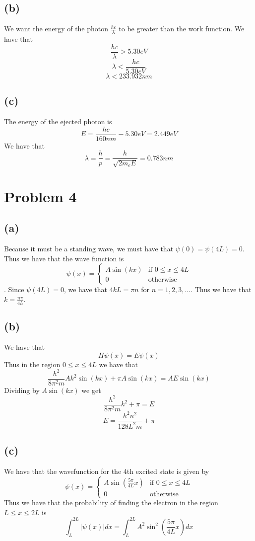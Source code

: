\subsection*{(b)}
We want the energy of the photon $\frac{hc}{\lambda}$ to be 
greater than the work function. We have that
$$\frac{hc}{\lambda}>5.30eV$$
$$\lambda<\frac{hc}{5.30eV}$$
$$\lambda<\boxed{233.932nm}$$
\subsection*{(c)}
The energy of the ejected photon is 
$$E=\frac{hc}{160nm}-5.30eV=2.449eV$$
We have that 
$$\lambda=\frac{h}{p}=\frac{h}{\sqrt{2m_e E}}= 0.783nm$$
\section*{Problem 4}
\subsection*{(a)}
Because it must be a standing wave, we must have that
$\psi(0)=\psi(4L)=0$. Thus we have that the wave function is
$$\psi(x)=\begin{cases}
    A\sin\left(kx\right) & \text{if } 0\leq x\leq 4L\\
    0 & \text{otherwise}
\end{cases}$$.
Since $\psi(4L)=0$, we have that $4kL=\pi n$ for 
$n=1,2,3,\ldots$. Thus we have that $k=\frac{n\pi}{4L}$.
\subsection*{(b)}
We have that 
$$H\psi(x)=E\psi(x)$$
Thus in the region $0\leq x\leq 4L$ we have that
$$\frac{h^2}{8\pi^2m}Ak^2\sin(kx)+\pi A\sin(kx)=AE\sin(kx)$$
Dividing by $A\sin(kx)$ we get 
$$\frac{h^2}{8\pi^2m}k^2+\pi=E$$
$$E=\boxed{\frac{h^2n^2}{128L^2m}+\pi}$$
\subsection*{(c)}
We have that the wavefunction for the 4th excited state is 
given by 
$$\psi(x)=\begin{cases}
    A\sin\left(\frac{5\pi}{4L}x\right) & \text{if } 0\leq x\leq 4L\\
    0 & \text{otherwise}
\end{cases}$$
Thus we have that the probability
of finding the electron in the region $L\leq x\leq 2L$ is
$$\int_{L}^{2L}|\psi(x)|dx=\int_{L}^{2L}A^2\sin^2\left(\frac{5\pi}{4L}x\right)dx$$
